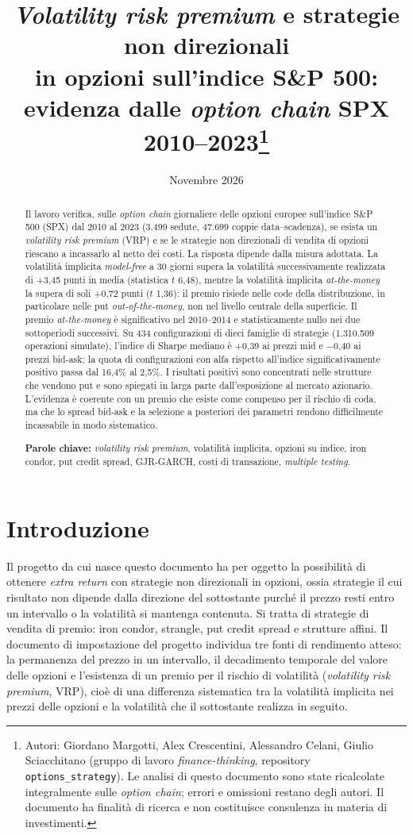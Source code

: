 \documentclass[11pt,a4paper]{article}
\title{\emph{Volatility risk premium} e strategie non direzionali\\ in opzioni sull'indice S\&P 500:\\ evidenza dalle \emph{option chain} SPX 2010--2023\thanks{Autori: Giordano Margotti, Alex Crescentini, Alessandro Celani, Giulio Sciacchitano (gruppo di lavoro \emph{finance-thinking}, repository \texttt{options\_strategy}). Le analisi di questo documento sono state ricalcolate integralmente sulle \emph{option chain}; errori e omissioni restano degli autori. Il documento ha finalità di ricerca e non costituisce consulenza in materia di investimenti.}}
\author{}
\date{Novembre 2026}
\begin{document}
{\let\newpage\relax\maketitle}
\vspace{-3em}

\begin{abstract}
\noindent Il lavoro verifica, sulle \emph{option chain} giornaliere delle opzioni europee sull'indice S\&P 500 (SPX) dal 2010 al 2023 (3.499 sedute, 47.699 coppie data--scadenza), se esista un \emph{volatility risk premium} (VRP) e se le strategie non direzionali di vendita di opzioni riescano a incassarlo al netto dei costi. La risposta dipende dalla misura adottata. La volatilità implicita \emph{model-free} a 30 giorni supera la volatilità successivamente realizzata di +3{,}45 punti in media (statistica $t$ 6{,}48), mentre la volatilità implicita \emph{at-the-money} la supera di soli +0{,}72 punti ($t$ 1{,}36): il premio risiede nelle code della distribuzione, in particolare nelle put \emph{out-of-the-money}, non nel livello centrale della superficie. Il premio \emph{at-the-money} è significativo nel 2010--2014 e statisticamente nullo nei due sottoperiodi successivi. Su 434 configurazioni di dieci famiglie di strategie (1.310.509 operazioni simulate), l'indice di Sharpe mediano è +0{,}39 ai prezzi mid e $-$0{,}40 ai prezzi bid-ask; la quota di configurazioni con alfa rispetto all'indice significativamente positivo passa dal 16{,}4\% al 2{,}5\%. I risultati positivi sono concentrati nelle strutture che vendono put e sono spiegati in larga parte dall'esposizione al mercato azionario. L'evidenza è coerente con un premio che esiste come compenso per il rischio di coda, ma che lo spread bid-ask e la selezione a posteriori dei parametri rendono difficilmente incassabile in modo sistematico.

\medskip\noindent\textbf{Parole chiave:} \emph{volatility risk premium}, volatilità implicita, opzioni su indice, iron condor, put credit spread, GJR-GARCH, costi di transazione, \emph{multiple testing}.
\end{abstract}

\section{Introduzione}

Il progetto da cui nasce questo documento ha per oggetto la possibilità di ottenere \emph{extra return} con strategie non direzionali in opzioni, ossia strategie il cui risultato non dipende dalla direzione del sottostante purché il prezzo resti entro un intervallo o la volatilità si mantenga contenuta. Si tratta di strategie di vendita di premio: iron condor, strangle, put credit spread e strutture affini. Il documento di impostazione del progetto individua tre fonti di rendimento atteso: la permanenza del prezzo in un intervallo, il decadimento temporale del valore delle opzioni e l'esistenza di un premio per il rischio di volatilità (\emph{volatility risk premium}, VRP), cioè di una differenza sistematica tra la volatilità implicita nei prezzi delle opzioni e la volatilità che il sottostante realizza in seguito.
\end{document}
